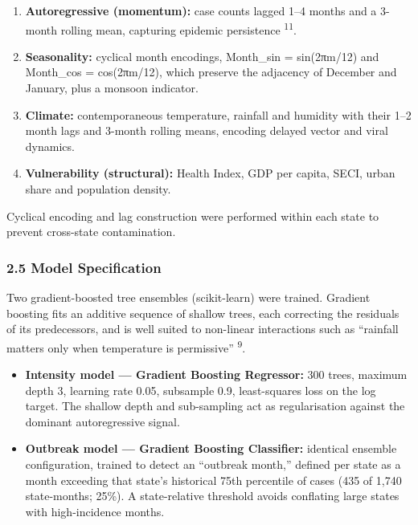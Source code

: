 \documentclass[
  10pt,
  twocolumn]{article}
\providecommand{\tightlist}{%
  \setlength{\itemsep}{0pt}\setlength{\parskip}{0pt}}
\begin{document}
\begin{enumerate}
\def\labelenumi{\arabic{enumi}.}
\tightlist
\item
  \textbf{Autoregressive (momentum):} case counts lagged 1--4 months and
  a 3-month rolling mean, capturing epidemic persistence
  \textsuperscript{11}.
\item
  \textbf{Seasonality:} cyclical month encodings, Month\_sin =
  sin(2πm/12) and Month\_cos = cos(2πm/12), which preserve the adjacency
  of December and January, plus a monsoon indicator.
\item
  \textbf{Climate:} contemporaneous temperature, rainfall and humidity
  with their 1--2 month lags and 3-month rolling means, encoding delayed
  vector and viral dynamics.
\item
  \textbf{Vulnerability (structural):} Health Index, GDP per capita,
  SECI, urban share and population density.
\end{enumerate}

Cyclical encoding and lag construction were performed within each state
to prevent cross-state contamination.

\subsubsection{2.5 Model Specification}\label{model-specification}

Two gradient-boosted tree ensembles (scikit-learn) were trained.
Gradient boosting fits an additive sequence of shallow trees, each
correcting the residuals of its predecessors, and is well suited to
non-linear interactions such as ``rainfall matters only when temperature
is permissive'' \textsuperscript{9}.

\begin{itemize}
\tightlist
\item
  \textbf{Intensity model --- Gradient Boosting Regressor:} 300 trees,
  maximum depth 3, learning rate 0.05, subsample 0.9, least-squares loss
  on the log target. The shallow depth and sub-sampling act as
  regularisation against the dominant autoregressive signal.
\item
  \textbf{Outbreak model --- Gradient Boosting Classifier:} identical
  ensemble configuration, trained to detect an ``outbreak month,''
  defined per state as a month exceeding that state's historical 75th
  percentile of cases (435 of 1,740 state-months; 25\%). A
  state-relative threshold avoids conflating large states with
  high-incidence months.
\end{itemize}
\end{document}
